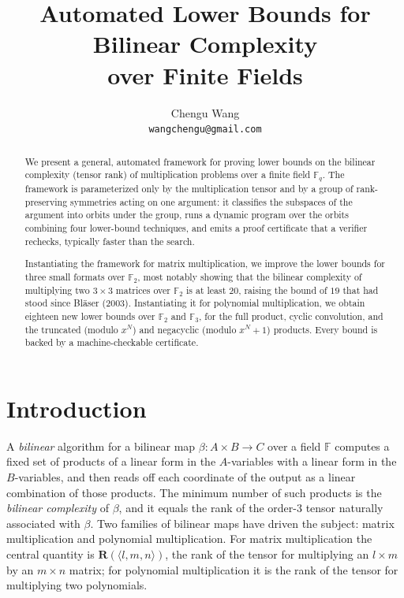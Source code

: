 \documentclass[11pt]{article}
\title{Automated Lower Bounds for Bilinear Complexity\\ over Finite Fields}
\author{}
\author{Chengu Wang\\ \texttt{wangchengu@gmail.com}}
\date{}
\theoremstyle{definition}
\newcommand{\F}{\mathbb{F}}
\newcommand{\R}{\mathbf{R}}
\newcommand{\mmt}[3]{\langle #1,#2,#3\rangle}
\begin{document}
\maketitle

\begin{abstract}
  We present a general, automated framework for proving lower bounds on the
  bilinear complexity (tensor rank) of multiplication problems over a finite field
  $\mathbb{F}_q$. The framework is parameterized only by the multiplication tensor and by a
  group of rank-preserving symmetries acting on one argument: it classifies
  the subspaces of the argument into orbits under the group, runs a dynamic program over
  the orbits combining four lower-bound techniques, and emits a proof certificate
  that a verifier rechecks, typically faster than the search.

  Instantiating the framework for matrix multiplication, we improve the lower bounds
  for three small formats over $\mathbb{F}_2$, most notably showing that
  the bilinear complexity of multiplying two $3 \times 3$ matrices over $\mathbb{F}_2$ is at
  least $20$, raising the bound of $19$ that had stood since Bl\"aser (2003).
  Instantiating it for polynomial multiplication, we obtain eighteen new lower
  bounds over $\mathbb{F}_2$ and $\mathbb{F}_3$, for the full product, cyclic
  convolution, and the truncated (modulo $x^N$) and negacyclic (modulo $x^N+1$)
  products.
  Every bound is backed by a machine-checkable certificate.
\end{abstract}

\section{Introduction}\label{sec:intro}

A \emph{bilinear} algorithm for a bilinear map $\beta\colon A\times B\to C$ over a
field $\F$ computes a fixed set of products of a linear form in the $A$-variables
with a linear form in the $B$-variables, and then reads off each coordinate of
the output as a linear combination of those products. The minimum number of such
products is the \emph{bilinear complexity} of $\beta$, and it equals the rank of
the order-$3$ tensor naturally associated with $\beta$. Two families of bilinear
maps have driven the subject: matrix multiplication and polynomial
multiplication. For matrix multiplication the central quantity is
$\R(\mmt{l}{m}{n})$, the rank of the tensor for multiplying an $l\times m$ by an
$m\times n$ matrix; for polynomial multiplication it is the rank of the tensor
for multiplying two polynomials.
\end{document}
